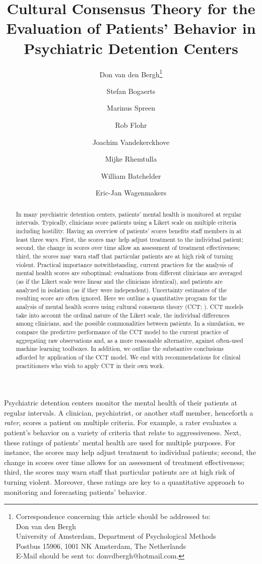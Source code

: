 \documentclass{article}
\title{Cultural Consensus Theory for the Evaluation of Patients’ Behavior in Psychiatric  Detention Centers}
\author[1]{Don van den Bergh\thanks{Correspondence concerning this article should be addressed to:  
\\  Don van den Bergh 
\\  University of Amsterdam, Department of Psychological Methods
\\  Postbus 15906, 1001 NK Amsterdam, The Netherlands
\\  E-Mail should be sent to: donvdbergh@hotmail.com.}}
\author[2]{Stefan Bogaerts}
\author[3]{Marinus Spreen}
\author[4]{Rob Flohr}
\author[5]{Joachim Vandekerckhove}
\author[6]{Mijke Rhemtulla}
\author[5]{William Batchelder}
\author[1]{Eric-Jan Wagenmakers}
\affil[1]{University of Amsterdam}
\affil[2]{University of Tilburg}
\affil[3]{Mesdag Clinic}
\affil[4]{Stenden University of Applied Sciences}
\affil[5]{University of California Irvine}
\affil[6]{??}
\date{}
\begin{document}
\listoftodos
\newpage
\maketitle

\begin{abstract}
In many psychiatric detention centers, patients' mental health is monitored at regular intervals. Typically, clinicians score patients using a Likert scale on multiple criteria including hostility. Having an overview of patients’ scores benefits staff members in at least three ways. First, the scores may help adjust treatment to the individual patient; second, the change in scores over time allow an assessment of treatment effectiveness; third, the scores may warn staff that particular patients are at high risk of turning violent. Practical importance notwithstanding, current practices for the analysis of mental health scores are suboptimal: evaluations from different clinicians are averaged (as if the Likert scale were linear and the clinicians identical), and patients are analyzed in isolation (as if they were independent). Uncertainty estimates of the resulting score are often ignored. Here we outline a quantitative program for the analysis of mental health scores using cultural consensus theory (CCT; ). CCT models take into account the ordinal nature of the Likert scale, the individual differences among clinicians, and the possible commonalities between patients. In a simulation, we compare the predictive performance of the CCT model to the current practice of aggregating raw observations and, as a more reasonable alternative, against often-used machine learning toolboxes. In addition, we outline the substantive conclusions afforded by application of the CCT model. We end with recommendations for clinical practitioners who wish to apply CCT in their own work. 
\end{abstract}

\newpage


Psychiatric detention centers monitor the mental health of their patients at regular intervals. A clinician, psychiatrist, or another staff member, henceforth a \textit{rater}, scores a patient on multiple criteria. For example, a rater evaluates a patient's behavior on a variety of criteria that relate to aggressiveness. Next, these ratings of patients' mental health are used for multiple purposes. For instance, the scores may help adjust treatment to individual patients; second, the change in scores over time allows for an assessment of treatment effectiveness; third, the scores may warn staff that particular patients are at high risk of turning violent. Moreover, these ratings are key to a quantitative approach to monitoring and forecasting patients' behavior.
\end{document}
